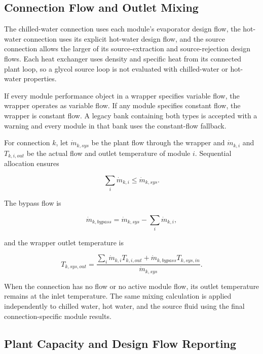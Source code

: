 \subsection{Connection Flow and Outlet Mixing}
\label{connection-flow-and-outlet-mixing}

The chilled-water connection uses each module's evaporator design flow, the hot-water connection uses its explicit hot-water design flow, and the source connection allows the larger of its source-extraction and source-rejection design flows. Each heat exchanger uses density and specific heat from its connected plant loop, so a glycol source loop is not evaluated with chilled-water or hot-water properties.

If every module performance object in a wrapper specifies variable flow, the wrapper operates as variable flow. If any module specifies constant flow, the wrapper is constant flow. A legacy bank containing both types is accepted with a warning and every module in that bank uses the constant-flow fallback.

For connection \(k\), let \(\dot m_{k,sys}\) be the plant flow through the wrapper and \(\dot m_{k,i}\) and \(T_{k,i,out}\) be the actual flow and outlet temperature of module \(i\). Sequential allocation ensures

\begin{equation}
\sum_i\dot m_{k,i}\leq\dot m_{k,sys}.
\end{equation}

The bypass flow is

\begin{equation}
\dot m_{k,bypass}=\dot m_{k,sys}-\sum_i\dot m_{k,i},
\end{equation}

and the wrapper outlet temperature is

\begin{equation}
T_{k,sys,out}=\frac{\sum_i\dot m_{k,i}T_{k,i,out}+\dot m_{k,bypass}T_{k,sys,in}}{\dot m_{k,sys}}.
\end{equation}

When the connection has no flow or no active module flow, its outlet temperature remains at the inlet temperature. The same mixing calculation is applied independently to chilled water, hot water, and the source fluid using the final connection-specific module results.

\subsection{Plant Capacity and Design Flow Reporting}
\label{plant-capacity-and-design-flow-reporting}

